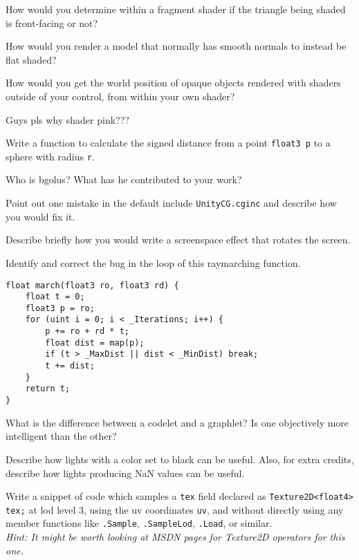 \documentclass{exam}
\begin{document}
\begin{questions}
\question How would you determine within a fragment shader if the triangle being shaded is front-facing or not?
\vspace{100pt}

\question How would you render a model that normally has smooth normals to instead be flat shaded?
\vspace{100pt}

\question How would you get the world position of opaque objects rendered with shaders outside of your control, from within your own shader?
\vspace{100pt}

\question Guys pls why shader pink???
\vspace{100pt}

\question Write a function to calculate the signed distance from a point \texttt{float3 p} to a sphere with radius \texttt{r}.
\vspace{100pt}

\question Who is bgolus? What has he contributed to your work?
\vspace{100pt}

\question Point out one mistake in the default include \texttt{UnityCG.cginc} and describe how you would fix it.
\vspace{100pt}

\question Describe briefly how you would write a screenspace effect that rotates the screen.
\vspace{100pt}

\question Identify and correct the bug in the loop of this raymarching function.
\begin{verbatim}
float march(float3 ro, float3 rd) {
    float t = 0;
    float3 p = ro;
    for (uint i = 0; i < _Iterations; i++) {
        p += ro + rd * t;
        float dist = map(p);
        if (t > _MaxDist || dist < _MinDist) break;
        t += dist;
    }
    return t;
}
\end{verbatim}

\question What is the difference between a codelet and a graphlet? Is one objectively more intelligent than the other?
\vspace{100pt}

\question Describe how lights with a color set to black can be useful. Also, for extra credits, describe how lights producing NaN values can be useful.
\vspace{100pt}

\question Write a snippet of code which samples a \texttt{tex} field declared as \texttt{Texture2D<float4> tex;} at lod level 3, using the uv coordinates \texttt{uv}, and without directly using any member functions like \texttt{.Sample}, \texttt{.SampleLod}, \texttt{.Load}, or similar.\\ \textit{Hint: It might be worth looking at MSDN pages for Texture2D operators for this one.}
\vspace{100pt}

\end{questions}
\end{document}
